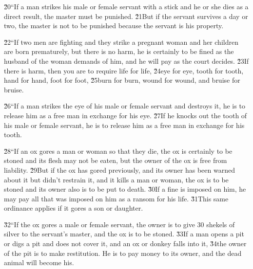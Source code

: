 \v{20}``If a man strikes his male or female servant with a stick and he or she dies as a direct result, the master must be punished. \v{21}But if the servant survives a day or two, the master is not to be punished because the servant is his property.

\v{22}``If two men are fighting and they strike a pregnant woman and her children are born prematurely, but there is no harm, he is certainly to be fined as the husband of the woman demands of him, and he will pay as the court decides. \v{23}If there is harm, then you are to require life for life, \v{24}eye for eye, tooth for tooth, hand for hand, foot for foot, \v{25}burn for burn, wound for wound, and bruise for bruise.

\v{26}``If a man strikes the eye of his male or female servant and destroys it, he is to release him as a free man in exchange for his eye. \v{27}If he knocks out the tooth of his male or female servant, he is to release him as a free man in exchange for his tooth.

\v{28}``If an ox gores a man or woman so that they die, the ox is certainly to be stoned and its flesh may not be eaten, but the owner of the ox is free from liability. \v{29}But if the ox has gored previously, and its owner has been warned about it but didn't restrain it, and it kills a man or woman, the ox is to be stoned and its owner also is to be put to death. \v{30}If a fine is imposed on him, he may pay all that was imposed on him as a ransom for his life. \v{31}This same ordinance applies if it gores a son or daughter.

\v{32}``If the ox gores a male or female servant, the owner is to give 30 shekels of silver to the servant's master, and the ox is to be stoned. \v{33}If a man opens a pit or digs a pit and does not cover it, and an ox or donkey falls into it, \v{34}the owner of the pit is to make restitution. He is to pay money to its owner, and the dead animal will become his.

